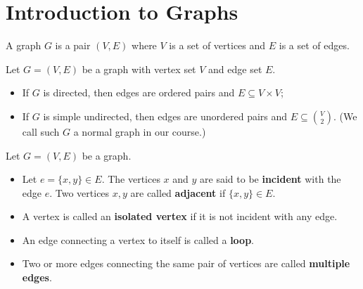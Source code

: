 \documentclass[11pt, a4paper]{ctexrep}
\begin{document}
\section{Introduction to Graphs}

\begin{definition}
    A graph $G$ is a pair $(V, E)$ where $V$ is a set of vertices and $E$ is a set of edges.
\end{definition}

Let $G=(V,E)$ be a graph with vertex set $V$ and edge set $E$.

\begin{itemize}
    \item If $G$ is directed, then edges are ordered pairs and $E\subseteq V\times V$;
    \item If $G$ is simple undirected, then edges are unordered pairs and
          $E\subseteq \binom{V}{2}$. (We call such $ G $ a normal graph in our course.)
\end{itemize}

\begin{definition}
    Let $G=(V,E)$ be a graph.
    \begin{itemize}
        \item Let $e=\{x,y\} \in E$. The vertices $x$ and $y$ are said to be \textbf{incident} with the edge $e$. Two vertices $x, y$ are called \textbf{adjacent} if $\{x,y\} \in E$.
        \item A vertex is called an \textbf{isolated vertex} if it is not incident with any edge.
        \item An edge connecting a vertex to itself is called a \textbf{loop}.
        \item Two or more edges connecting the same pair of vertices are called \textbf{multiple edges}.
    \end{itemize}
\end{definition}
\end{document}
